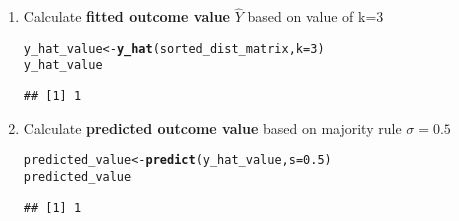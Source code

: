 \documentclass[../../dsa1101_notes.Rtex]{subfiles}\usepackage[]{graphicx}\usepackage[]{color}
\makeatletter
\newcommand{\hlnum}[1]{\textcolor[rgb]{0.686,0.059,0.569}{#1}}%
\newcommand{\hlstd}[1]{\textcolor[rgb]{0.345,0.345,0.345}{#1}}%
\newcommand{\hlkwb}[1]{\textcolor[rgb]{0.69,0.353,0.396}{#1}}%
\newcommand{\hlkwc}[1]{\textcolor[rgb]{0.333,0.667,0.333}{#1}}%
\newcommand{\hlkwd}[1]{\textcolor[rgb]{0.737,0.353,0.396}{\textbf{#1}}}%
\newenvironment{kframe}{%
 \def\at@end@of@kframe{}%
 \ifinner\ifhmode%
  \def\at@end@of@kframe{\end{minipage}}%
  \begin{minipage}{\columnwidth}%
 \fi\fi%
 \def\FrameCommand##1{\hskip\@totalleftmargin \hskip-\fboxsep
 \colorbox{shadecolor}{##1}\hskip-\fboxsep
     \hskip-\linewidth \hskip-\@totalleftmargin \hskip\columnwidth}%
 \MakeFramed {\advance\hsize-\width
   \@totalleftmargin\z@ \linewidth\hsize
   \@setminipage}}%
 {\par\unskip\endMakeFramed%
 \at@end@of@kframe}
\newenvironment{knitrout}{}{} %
\makeatother
\begin{document}
\begin{enumerate}
\item Calculate \textbf{fitted outcome value} \(\hat{Y}\) based on value of k=3
\begin{knitrout}
\color{fgcolor}\begin{kframe}
\begin{alltt}
\hlstd{y_hat_value} \hlkwb{<-} \hlkwd{y_hat}\hlstd{(sorted_dist_matrix,} \hlkwc{k}\hlstd{=}\hlnum{3}\hlstd{)}
\hlstd{y_hat_value}
\end{alltt}
\begin{verbatim}
## [1] 1
\end{verbatim}
\end{kframe}
\end{knitrout}
\item Calculate \textbf{predicted outcome value} based on majority rule \(\sigma=0.5\)
\begin{knitrout}
\color{fgcolor}\begin{kframe}
\begin{alltt}
\hlstd{predicted_value} \hlkwb{<-} \hlkwd{predict}\hlstd{(y_hat_value,} \hlkwc{s}\hlstd{=}\hlnum{0.5}\hlstd{)}
\hlstd{predicted_value}
\end{alltt}
\begin{verbatim}
## [1] 1
\end{verbatim}
\end{kframe}
\end{knitrout}
\end{enumerate}
\end{document}
